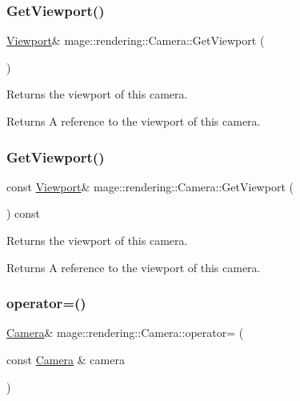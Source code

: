 \subsubsection{\texorpdfstring{Get\+Viewport()}{GetViewport()}\hspace{0.1cm}{\footnotesize\ttfamily [1/2]}}
{\footnotesize\ttfamily \hyperlink{classmage_1_1rendering_1_1_viewport}{Viewport}\& mage\+::rendering\+::\+Camera\+::\+Get\+Viewport (\begin{DoxyParamCaption}{ }\end{DoxyParamCaption})\hspace{0.3cm}{\ttfamily [noexcept]}}

Returns the viewport of this camera.

\begin{DoxyReturn}{Returns}
A reference to the viewport of this camera. 
\end{DoxyReturn}
\hypertarget{classmage_1_1rendering_1_1_camera_a5d91ec5a395b638140c107a192faa2a3}{}\label{classmage_1_1rendering_1_1_camera_a5d91ec5a395b638140c107a192faa2a3} 
\subsubsection{\texorpdfstring{Get\+Viewport()}{GetViewport()}\hspace{0.1cm}{\footnotesize\ttfamily [2/2]}}
{\footnotesize\ttfamily const \hyperlink{classmage_1_1rendering_1_1_viewport}{Viewport}\& mage\+::rendering\+::\+Camera\+::\+Get\+Viewport (\begin{DoxyParamCaption}{ }\end{DoxyParamCaption}) const\hspace{0.3cm}{\ttfamily [noexcept]}}

Returns the viewport of this camera.

\begin{DoxyReturn}{Returns}
A reference to the viewport of this camera. 
\end{DoxyReturn}
\hypertarget{classmage_1_1rendering_1_1_camera_a3aceb5277ca9ea66037de3d5ed44434a}{}\label{classmage_1_1rendering_1_1_camera_a3aceb5277ca9ea66037de3d5ed44434a} 
\subsubsection{\texorpdfstring{operator=()}{operator=()}\hspace{0.1cm}{\footnotesize\ttfamily [1/2]}}
{\footnotesize\ttfamily \hyperlink{classmage_1_1rendering_1_1_camera}{Camera}\& mage\+::rendering\+::\+Camera\+::operator= (\begin{DoxyParamCaption}\item[{const \hyperlink{classmage_1_1rendering_1_1_camera}{Camera} \&}]{camera }\end{DoxyParamCaption})\hspace{0.3cm}{\ttfamily [delete]}}


